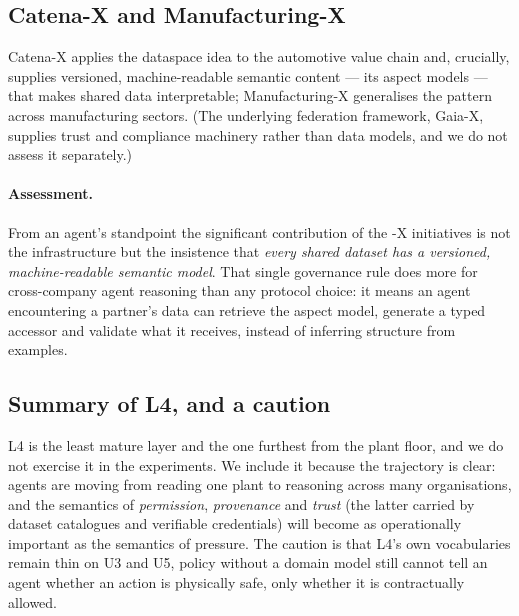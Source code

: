 \subsection{Catena-X and Manufacturing-X}

Catena-X applies the dataspace idea to the automotive value chain and, crucially,
supplies versioned, machine-readable semantic content --- its aspect models ---
that makes shared data interpretable; Manufacturing-X generalises the pattern
across manufacturing sectors. (The underlying federation framework, Gaia-X,
supplies trust and compliance machinery rather than data models, and we do not
assess it separately.)

\paragraph{Assessment.} From an agent's standpoint the significant contribution
of the -X initiatives is not the infrastructure but the insistence that
\emph{every shared dataset has a versioned, machine-readable semantic model}.
That single governance rule does more for cross-company agent reasoning than any
protocol choice: it means an agent encountering a partner's data can retrieve the
aspect model, generate a typed accessor and validate what it receives, instead of
inferring structure from examples.

\subsection{Summary of L4, and a caution}

L4 is the least mature layer and the one furthest from the plant floor, and we do
not exercise it in the experiments. We include it because the trajectory is
clear: agents are moving from reading one plant to reasoning across many
organisations, and the semantics of \emph{permission}, \emph{provenance} and
\emph{trust} (the latter carried by dataset catalogues and verifiable credentials)
will become as operationally important as the semantics of pressure. The caution is
that L4's own vocabularies remain thin on U3 and U5, policy without a domain
model still cannot tell an agent whether an action is physically safe, only
whether it is contractually allowed.
